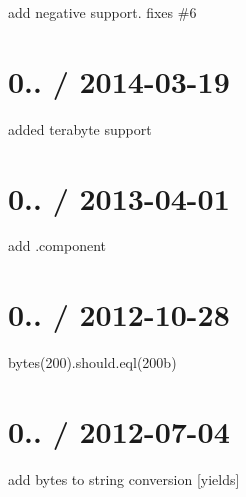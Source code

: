 
\begin{DoxyItemize}
\item add negative support. fixes \#6
\end{DoxyItemize}

\section*{0.. / 2014-\/03-\/19 }


\begin{DoxyItemize}
\item added terabyte support
\end{DoxyItemize}

\section*{0.. / 2013-\/04-\/01 }


\begin{DoxyItemize}
\item add .component
\end{DoxyItemize}

\section*{0.. / 2012-\/10-\/28 }


\begin{DoxyItemize}
\item bytes(200).should.\+eql(\textquotesingle{}200b\textquotesingle{})
\end{DoxyItemize}

\section*{0.. / 2012-\/07-\/04 }


\begin{DoxyItemize}
\item add bytes to string conversion \mbox{[}yields\mbox{]} 
\end{DoxyItemize}
